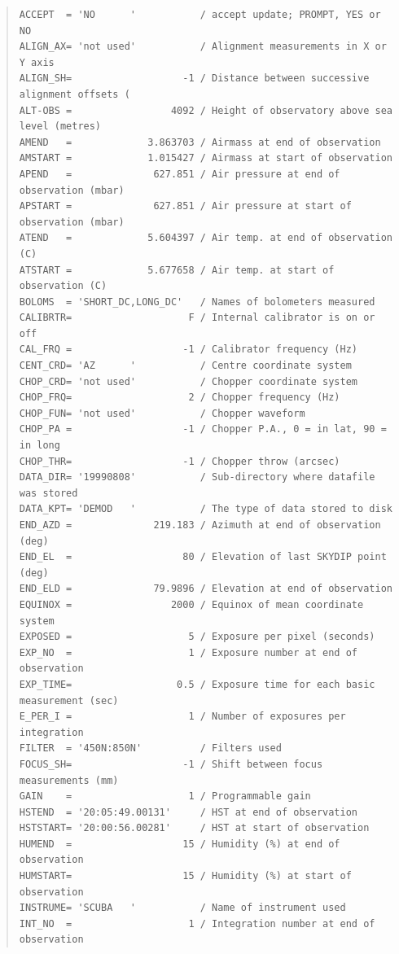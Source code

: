 \documentclass[twoside,11pt]{article}
\newenvironment{myquote}{\begin{quote}\begin{small}}{\end{small}\end{quote}}
\renewcommand{\_}{\texttt{\symbol{95}}}
\begin{document}
\begin{myquote}
\begin{verbatim}
ACCEPT  = 'NO      '           / accept update; PROMPT, YES or NO
ALIGN_AX= 'not used'           / Alignment measurements in X or Y axis
ALIGN_SH=                   -1 / Distance between successive alignment offsets (
ALT-OBS =                 4092 / Height of observatory above sea level (metres)
AMEND   =             3.863703 / Airmass at end of observation
AMSTART =             1.015427 / Airmass at start of observation
APEND   =              627.851 / Air pressure at end of observation (mbar)
APSTART =              627.851 / Air pressure at start of observation (mbar)
ATEND   =             5.604397 / Air temp. at end of observation (C)
ATSTART =             5.677658 / Air temp. at start of observation (C)
BOLOMS  = 'SHORT_DC,LONG_DC'   / Names of bolometers measured
CALIBRTR=                    F / Internal calibrator is on or off
CAL_FRQ =                   -1 / Calibrator frequency (Hz)
CENT_CRD= 'AZ      '           / Centre coordinate system
CHOP_CRD= 'not used'           / Chopper coordinate system
CHOP_FRQ=                    2 / Chopper frequency (Hz)
CHOP_FUN= 'not used'           / Chopper waveform
CHOP_PA =                   -1 / Chopper P.A., 0 = in lat, 90 = in long
CHOP_THR=                   -1 / Chopper throw (arcsec)
DATA_DIR= '19990808'           / Sub-directory where datafile was stored
DATA_KPT= 'DEMOD   '           / The type of data stored to disk
END_AZD =              219.183 / Azimuth at end of observation (deg)
END_EL  =                   80 / Elevation of last SKYDIP point (deg)
END_ELD =              79.9896 / Elevation at end of observation
EQUINOX =                 2000 / Equinox of mean coordinate system
EXPOSED =                    5 / Exposure per pixel (seconds)
EXP_NO  =                    1 / Exposure number at end of observation
EXP_TIME=                  0.5 / Exposure time for each basic measurement (sec)
E_PER_I =                    1 / Number of exposures per integration
FILTER  = '450N:850N'          / Filters used
FOCUS_SH=                   -1 / Shift between focus measurements (mm)
GAIN    =                    1 / Programmable gain
HSTEND  = '20:05:49.00131'     / HST at end of observation
HSTSTART= '20:00:56.00281'     / HST at start of observation
HUMEND  =                   15 / Humidity (%) at end of observation
HUMSTART=                   15 / Humidity (%) at start of observation
INSTRUME= 'SCUBA   '           / Name of instrument used
INT_NO  =                    1 / Integration number at end of observation

\end{verbatim}
\end{myquote}
\end{document}
